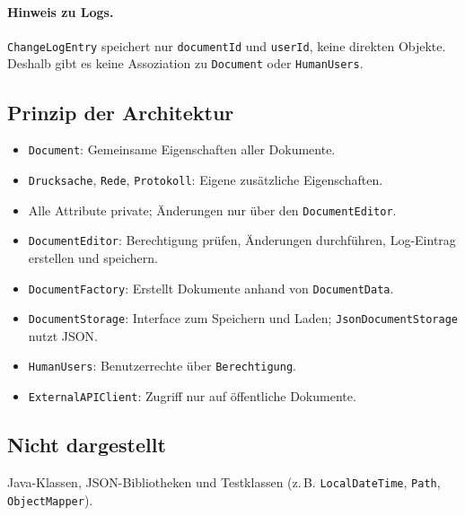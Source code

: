 \paragraph{Hinweis zu Logs.}
\texttt{ChangeLogEntry} speichert nur \texttt{documentId} und \texttt{userId}, keine direkten Objekte. Deshalb gibt es keine Assoziation zu \texttt{Document} oder \texttt{HumanUsers}.

\subsection{Prinzip der Architektur}
\begin{itemize}
    \item \texttt{Document}: Gemeinsame Eigenschaften aller Dokumente.
    \item \texttt{Drucksache}, \texttt{Rede}, \texttt{Protokoll}: Eigene zusätzliche Eigenschaften.
    \item Alle Attribute private; Änderungen nur über den \texttt{DocumentEditor}.
    \item \texttt{DocumentEditor}: Berechtigung prüfen, Änderungen durchführen, Log-Eintrag erstellen und speichern.
    \item \texttt{DocumentFactory}: Erstellt Dokumente anhand von \texttt{DocumentData}.
    \item \texttt{DocumentStorage}: Interface zum Speichern und Laden; \texttt{JsonDocumentStorage} nutzt JSON.
    \item \texttt{HumanUsers}: Benutzerrechte über \texttt{Berechtigung}.
    \item \texttt{ExternalAPIClient}: Zugriff nur auf öffentliche Dokumente.
\end{itemize}

\subsection{Nicht dargestellt}
Java-Klassen, JSON-Bibliotheken und Testklassen (z.\,B. \texttt{LocalDateTime}, \texttt{Path}, \texttt{ObjectMapper}).